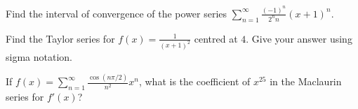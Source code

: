 \documentclass[12pt,addpoints]{exam}
\begin{document}
\begin{questions}

\question[5] Find the interval of convergence of the power series $\sum_{n=1}^\infty \frac{(-1)^n}{2^n n}(x+1)^n$. 

\question[5] Find the Taylor series for $f(x) = \frac{1}{(x+1)^2}$ centred at $4$. Give your answer using sigma notation.

\question[1] If $f(x) = \sum_{n=1}^\infty \frac{\cos(n\pi/2)}{n^2}x^n$, what is the coefficient of $x^{25}$ in the Maclaurin series for $f'(x)$? 
\end{questions}
\end{document}
